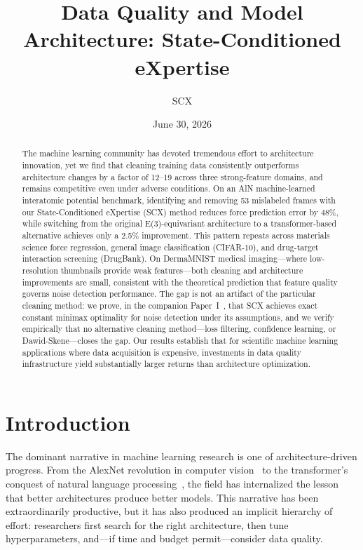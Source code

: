 \documentclass[12pt,a4paper]{article}
\title{Data Quality and Model Architecture: State-Conditioned eXpertise}
\author{SCX}
\date{June 30, 2026}
\begin{document}
\maketitle

\begin{abstract}
The machine learning community has devoted tremendous effort to architecture innovation, yet we find that cleaning training data consistently outperforms architecture changes by a factor of 12--19 across three strong-feature domains, and remains competitive even under adverse conditions. On an AlN machine-learned interatomic potential benchmark, identifying and removing 53 mislabeled frames with our State-Conditioned eXpertise (SCX) method reduces force prediction error by 48\%, while switching from the original E(3)-equivariant architecture to a transformer-based alternative achieves only a 2.5\% improvement. This pattern repeats across materials science force regression, general image classification (CIFAR-10), and drug-target interaction screening (DrugBank). On DermaMNIST medical imaging---where low-resolution thumbnails provide weak features---both cleaning and architecture improvements are small, consistent with the theoretical prediction that feature quality governs noise detection performance. The gap is not an artifact of the particular cleaning method: we prove, in the companion Paper~I~\cite{xi2025fundamental}, that SCX achieves exact constant minimax optimality for noise detection under its assumptions, and we verify empirically that no alternative cleaning method---loss filtering, confidence learning, or Dawid-Skene---closes the gap. Our results establish that for scientific machine learning applications where data acquisition is expensive, investments in data quality infrastructure yield substantially larger returns than architecture optimization.
\end{abstract}

\section{Introduction}

The dominant narrative in machine learning research is one of architecture-driven progress. From the AlexNet revolution in computer vision~\cite{krizhevsky2012imagenet} to the transformer's conquest of natural language processing~\cite{vaswani2017attention}, the field has internalized the lesson that better architectures produce better models. This narrative has been extraordinarily productive, but it has also produced an implicit hierarchy of effort: researchers first search for the right architecture, then tune hyperparameters, and---if time and budget permit---consider data quality.
\end{document}
